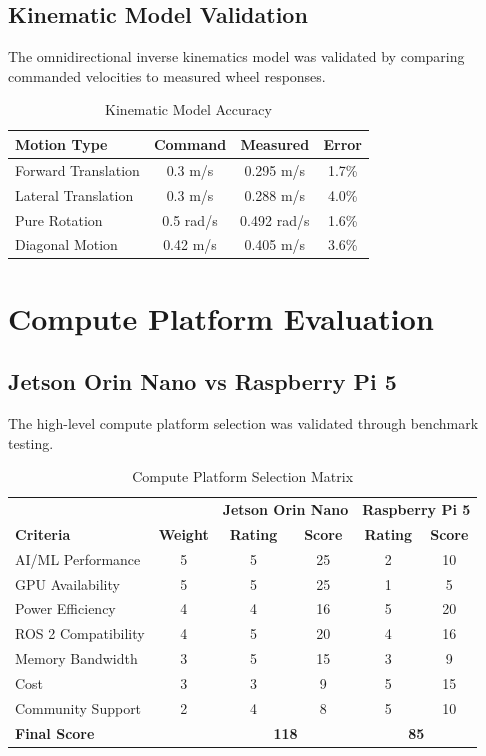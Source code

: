\subsection{Kinematic Model Validation}

The omnidirectional inverse kinematics model was validated by comparing commanded velocities to measured wheel responses.

\begin{table}[H]
\centering
\caption{Kinematic Model Accuracy}
\label{tab:kinematics_validation}
\begin{tabular}{|l|c|c|c|}
\hline
\textbf{Motion Type} & \textbf{Command} & \textbf{Measured} & \textbf{Error} \\
\hline
Forward Translation & 0.3 m/s & 0.295 m/s & 1.7\% \\
Lateral Translation & 0.3 m/s & 0.288 m/s & 4.0\% \\
Pure Rotation & 0.5 rad/s & 0.492 rad/s & 1.6\% \\
Diagonal Motion & 0.42 m/s & 0.405 m/s & 3.6\% \\
\hline
\end{tabular}
\end{table}

\section{Compute Platform Evaluation}
\label{sec:compute_results}

\subsection{Jetson Orin Nano vs Raspberry Pi 5}

The high-level compute platform selection was validated through benchmark testing.

\begin{table}[H]
\centering
\caption{Compute Platform Selection Matrix}
\label{tab:compute_selection}
\begin{tabular}{|l|c|c|c|c|c|}
\hline
 & & \multicolumn{2}{c|}{\textbf{Jetson Orin Nano}} & \multicolumn{2}{c|}{\textbf{Raspberry Pi 5}} \\
\textbf{Criteria} & \textbf{Weight} & \textbf{Rating} & \textbf{Score} & \textbf{Rating} & \textbf{Score} \\
\hline
AI/ML Performance & 5 & 5 & 25 & 2 & 10 \\
GPU Availability & 5 & 5 & 25 & 1 & 5 \\
Power Efficiency & 4 & 4 & 16 & 5 & 20 \\
ROS 2 Compatibility & 4 & 5 & 20 & 4 & 16 \\
Memory Bandwidth & 3 & 5 & 15 & 3 & 9 \\
Cost & 3 & 3 & 9 & 5 & 15 \\
Community Support & 2 & 4 & 8 & 5 & 10 \\
\hline
\textbf{Final Score} & & \multicolumn{2}{c|}{\textbf{118}} & \multicolumn{2}{c|}{\textbf{85}} \\
\hline
\end{tabular}
\end{table}

